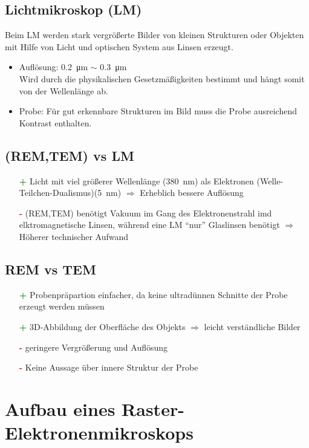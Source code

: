 \subsection*{Lichtmikroskop (LM)}
Beim LM werden stark vergrößerte Bilder von kleinen Strukturen oder Objekten mit Hilfe von Licht und optischen System aus Linsen erzeugt.
\begin{itemize}
    \item Auflösung: \SI{0,2}{\micro\metre} $\sim$ \SI{0,3}{\micro\metre}\\
    Wird durch die physikalischen Gesetzmäßigkeiten bestimmt und hängt somit von der Wellenlänge ab. 
    \item Probe: Für gut erkennbare Strukturen im Bild muss die Probe ausreichend Kontrast enthalten. \citep{WikiLM}
\end{itemize}

\subsection*{(REM,TEM) vs LM}
\begin{itemize}
    \item[\textcolor{green}{\textbf{+}}] Licht mit viel größerer Wellenlänge (\SI{380}{\nano\metre}) als Elektronen (Welle-Teilchen-Dualismus)(\SI{5}{\nano\metre}) $\Rightarrow$ Erheblich bessere Auflösung
    \item[\textcolor{red}{\textbf{-}}] (REM,TEM) benötigt Vakuum im Gang des Elektronenstrahl imd elktromagnetische Linsen, während eine LM \enquote{nur} Glaslinsen benötigt $\Rightarrow$ Höherer technischer Aufwand \citep{RuppelEM}
\end{itemize}

\subsection*{REM vs TEM}
\begin{itemize}
    \item[\textcolor{green}{\textbf{+}}] Probenpräpartion einfacher, da keine ultradünnen Schnitte der Probe erzeugt werden müssen
    \item[\textcolor{green}{\textbf{+}}] 3D-Abbildung der Oberfläche des Objekts $\Rightarrow$ leicht verständliche Bilder 
    \item[\textcolor{red}{\textbf{-}}] geringere Vergrößerung und Auflösung
    \item[\textcolor{red}{\textbf{-}}] Keine Aussage über innere Struktur der Probe \citep{RuppelEM} 
\end{itemize}

\section{Aufbau eines Raster-Elektronenmikroskops}
\label{sec:aufbau}

